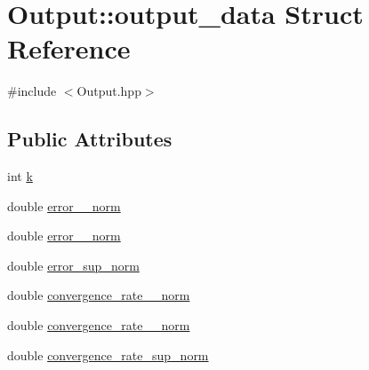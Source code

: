 \hypertarget{structOutput_1_1output__data}{\section{Output\-:\-:output\-\_\-data Struct Reference}
\label{structOutput_1_1output__data}
}


{\ttfamily \#include $<$Output.\-hpp$>$}

\subsection*{Public Attributes}
\begin{DoxyCompactItemize}
\item 
int \hyperlink{structOutput_1_1output__data_a542d1b4fb07ccca6aa777459e7d6d44c}{k}
\item 
double \hyperlink{structOutput_1_1output__data_ae0785e50071d79c453d8242fabcc031a}{error\-\_\-\_\-norm}
\item 
double \hyperlink{structOutput_1_1output__data_a5fe831e4e8f63c2e80288fa44a4df464}{error\-\_\-\_\-norm}
\item 
double \hyperlink{structOutput_1_1output__data_a1a857f7f9a97056761e57592c1c61d6c}{error\-\_\-sup\-\_\-norm}
\item 
double \hyperlink{structOutput_1_1output__data_ab43524ad30c5a4e2bfe62505a2d21275}{convergence\-\_\-rate\-\_\-\_\-norm}
\item 
double \hyperlink{structOutput_1_1output__data_a401bfeb1e105ebdb2dc317443244e3c5}{convergence\-\_\-rate\-\_\-\_\-norm}
\item 
double \hyperlink{structOutput_1_1output__data_a6f1b9912c7373ea87fc42ce4ae325b8f}{convergence\-\_\-rate\-\_\-sup\-\_\-norm}
\end{DoxyCompactItemize}



